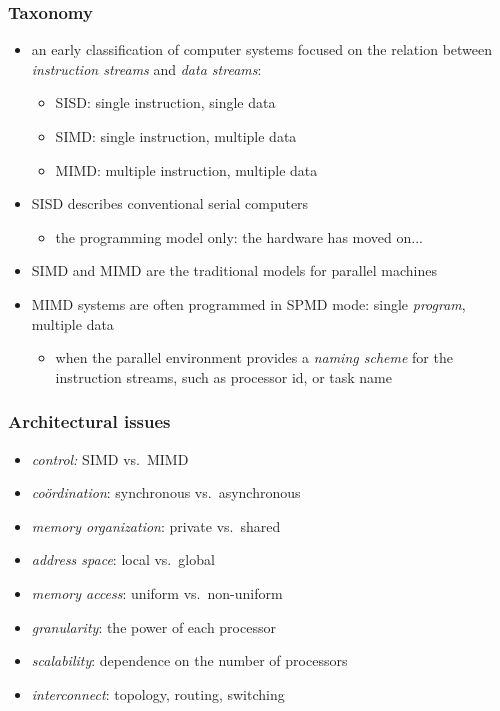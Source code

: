 \begin{frame}[fragile]
%
  \frametitle{Taxonomy}
%
  \begin{itemize}
%
  \item an early classification of computer systems focused on the relation between {\em
    instruction streams} and {\em data streams}:
    \begin{itemize}
      \item SISD: single instruction, single data
      \item SIMD: single instruction, multiple data
      \item MIMD: multiple instruction, multiple data
    \end{itemize}
%
    \item SISD describes conventional serial computers
    \begin{itemize}
      \item the programming model only: the hardware has moved on...
    \end{itemize}
%
    \item SIMD and MIMD are the traditional models for parallel machines
%
    \item MIMD systems are often programmed in SPMD mode: single {\em program}, multiple data
      \begin{itemize}
      \item when the parallel environment provides a {\em naming scheme} for the instruction
        streams, such as processor id, or task name
      \end{itemize}
  \end{itemize}
%
\end{frame}

\begin{frame}[fragile]
%
  \frametitle{Architectural issues}
%
  \begin{itemize}
%
  \item {\em control:} SIMD vs.~MIMD
  \item {\em co\"ordination}: synchronous vs.~asynchronous
  \item {\em memory organization}: private vs.~shared
  \item {\em address space}: local vs.~global
  \item {\em memory access}: uniform vs.~non-uniform
  \item {\em granularity}: the power of each processor
  \item {\em scalability}: dependence on the number of processors
  \item {\em interconnect}: topology, routing, switching
%
  \end{itemize}
%
\end{frame}


